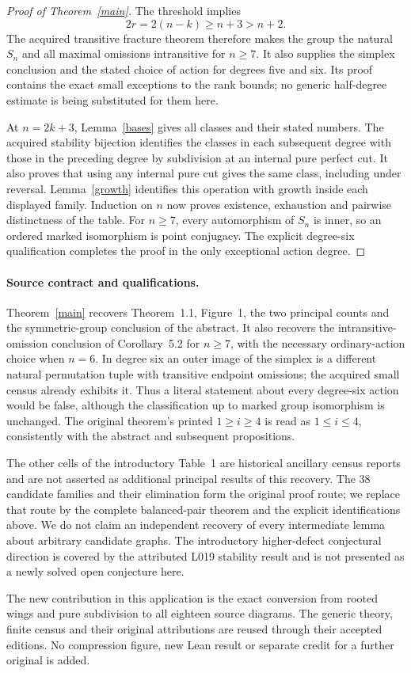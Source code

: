 \documentclass[11pt,a4paper]{article}
\begin{document}
\begin{proof}[Proof of Theorem~\ref{main}]
The threshold implies
\[
                 2r=2(n-k)\ge n+3>n+2.
\]
The acquired transitive fracture theorem therefore makes the group
the natural $S_n$ and all maximal omissions intransitive for $n\ge7$.
It also supplies the simplex conclusion and the stated choice of
action for degrees five and six. Its proof contains the exact small
exceptions to the rank bounds; no generic half-degree estimate is
being substituted for them here.

At $n=2k+3$, Lemma~\ref{bases} gives all classes and their stated
numbers. The acquired stability bijection identifies the classes
in each subsequent degree with those in the preceding degree by
subdivision at an internal pure perfect cut. It also proves that
using any internal pure cut gives the same class, including under
reversal. Lemma~\ref{growth} identifies this operation with growth
inside each displayed family. Induction on $n$ now proves existence,
exhaustion and pairwise distinctness of the table. For $n\ge7$, every
automorphism of $S_n$ is inner, so an ordered marked isomorphism is
point conjugacy. The explicit degree-six qualification completes
the proof in the only exceptional action degree.
\end{proof}

\paragraph{Source contract and qualifications.}
Theorem~\ref{main} recovers Theorem~1.1, Figure~1, the two principal
counts and the symmetric-group conclusion of the abstract. It also
recovers the intransitive-omission conclusion of Corollary~5.2 for
$n\ge7$, with the necessary ordinary-action choice when $n=6$.
In degree six an outer image of the simplex is a different natural
permutation tuple with transitive endpoint omissions; the acquired
small census already exhibits it. Thus a literal statement about
every degree-six action would be false, although the classification
up to marked group isomorphism is unchanged. The original theorem's
printed $1\ge i\ge4$ is read as $1\le i\le4$, consistently with
the abstract and subsequent propositions.

The other cells of the introductory Table~1 are historical ancillary
census reports and are not asserted as additional principal results
of this recovery. The 38 candidate families and their elimination
form the original proof route; we replace that route by the complete
balanced-pair theorem and the explicit identifications above. We do
not claim an independent recovery of every intermediate lemma about
arbitrary candidate graphs. The introductory higher-defect conjectural
direction is covered by the attributed L019 stability result and
is not presented as a newly solved open conjecture here.

The new contribution in this application is the exact conversion from
rooted wings and pure subdivision to all eighteen source diagrams.
The generic theory, finite census and their original attributions
are reused through their accepted editions. No compression figure,
new Lean result or separate credit for a further original is added.
\end{document}
